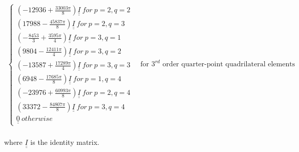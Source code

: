 \begin{equation}
\begin{split}
\begin{cases}
\left(-12936+\frac{33003\pi}{8}\right)\underline{\underline{I}}\ for\ p=2,q=2\\
\left(17988-\frac{45837\pi}{8}\right)\underline{\underline{I}}\ for\ p=2,q=3\\
\left(-\frac{8453}{3}+\frac{3595\pi}{4}\right)\underline{\underline{I}}\ for\ p=3,q=1\\
\left(9804-\frac{12411\pi}{4}\right)\underline{\underline{I}}\ for\ p=3,q=2\\
\left(-13587+\frac{17289\pi}{4}\right)\underline{\underline{I}}\ for\ p=3,q=3\\
\left(6948-\frac{17685\pi}{8}\right)\underline{\underline{I}}\ for\ p=1,q=4\\
\left(-23976+\frac{60993\pi}{8}\right)\underline{\underline{I}}\ for\ p=2,q=4\\
\left(33372-\frac{84807\pi}{8}\right)\underline{\underline{I}}\ for\ p=3,q=4\\
\underline{\underline{0}}\ otherwise
\end{cases}\quad \text{for $3^{rd}$ order quarter-point quadrilateral elements}\\
\end{split}
\end{equation}

where $\underline{\underline{I}}$ is the identity matrix.

